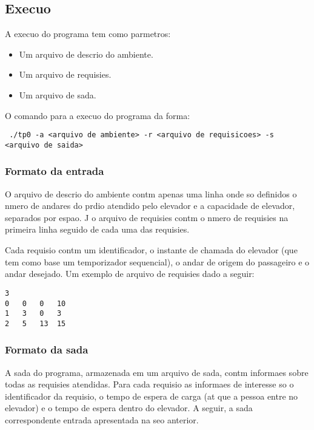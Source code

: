 \documentclass[12pt]{article}
\begin{document}
\subsection{Execuo}

A execuo do programa tem como parmetros:
\begin{itemize}
\item Um arquivo de descrio do ambiente.
\item Um arquivo de requisies.
\item Um arquivo de sada.
\end{itemize}

O comando para a execuo do programa  da forma:

\begin{footnotesize}
\begin{verbatim} ./tp0 -a <arquivo de ambiente> -r <arquivo de requisicoes> -s <arquivo de saida> \end{verbatim}
\end{footnotesize}

\subsubsection{Formato da entrada}

O arquivo de descrio do ambiente contm apenas uma linha onde so definidos o nmero de andares do prdio atendido pelo elevador e a capacidade de elevador, separados por espao. J o arquivo de requisies contm o nmero de requisies na primeira linha seguido de cada uma das requisies.

Cada requisio contm um identificador, o instante de chamada do elevador (que tem como base um temporizador sequencial), o andar de origem do passageiro e o andar desejado. Um exemplo de arquivo de requisies  dado a seguir:

\begin{footnotesize}
\begin{verbatim}
3
0	0	0	10
1	3	0	3
2	5	13	15
\end{verbatim}
\end{footnotesize}

\subsubsection{Formato da sada}

A sada do programa, armazenada em um arquivo de sada, contm informaes sobre todas as requisies atendidas.  Para cada requisio as informaes de interesse so o identificador da requisio, o tempo de espera de carga (at que a pessoa entre no elevador) e o tempo de espera dentro do elevador. A seguir, a sada correspondente  entrada apresentada na seo anterior.
\end{document}
